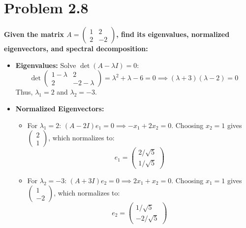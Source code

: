 \documentclass{article}
\begin{document}
\section*{Problem 2.8}
\noindent \textbf{Given the matrix $A = \begin{pmatrix}1&2\\ 2&-2\end{pmatrix}$, find its eigenvalues, normalized eigenvectors, and spectral decomposition:}
\begin{itemize}
    \item \textbf{Eigenvalues:}
    Solve $\det(A - \lambda I) = 0$:
    \[
    \det \begin{pmatrix}1-\lambda & 2\\ 2 & -2-\lambda\end{pmatrix} = \lambda^2 + \lambda - 6 = 0 \implies (\lambda + 3)(\lambda - 2) = 0
    \]
    Thus, $\lambda_1 = 2$ and $\lambda_2 = -3$.

    \item \textbf{Normalized Eigenvectors:}
    \begin{itemize}
        \item For $\lambda_1 = 2$: $(A - 2I)e_1 = 0 \implies -x_1 + 2x_2 = 0$. Choosing $x_2 = 1$ gives $\begin{pmatrix}2\\ 1\end{pmatrix}$, which normalizes to:
        \[
        e_1 = \begin{pmatrix} 2/\sqrt{5} \\ 1/\sqrt{5} \end{pmatrix}
        \]
        \item For $\lambda_2 = -3$: $(A + 3I)e_2 = 0 \implies 2x_1 + x_2 = 0$. Choosing $x_1 = 1$ gives $\begin{pmatrix}1\\ -2\end{pmatrix}$, which normalizes to:
        \[
        e_2 = \begin{pmatrix} 1/\sqrt{5} \\ -2/\sqrt{5} \end{pmatrix}
        \]
    \end{itemize}


\end{itemize}
\end{document}
